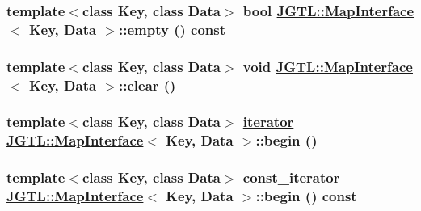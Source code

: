\hypertarget{class_j_g_t_l_1_1_map_interface_66e2355bebebd18fca84dee62e0fffa5}{
\subsubsection[empty]{\setlength{\rightskip}{0pt plus 5cm}template$<$class Key, class Data$>$ bool \hyperlink{class_j_g_t_l_1_1_map_interface}{JGTL::Map\-Interface}$<$ Key, Data $>$::empty () const}}
\label{class_j_g_t_l_1_1_map_interface_66e2355bebebd18fca84dee62e0fffa5}


\hypertarget{class_j_g_t_l_1_1_map_interface_af2d3667a3a9cf577177720e2b757d03}{
\subsubsection[clear]{\setlength{\rightskip}{0pt plus 5cm}template$<$class Key, class Data$>$ void \hyperlink{class_j_g_t_l_1_1_map_interface}{JGTL::Map\-Interface}$<$ Key, Data $>$::clear ()}}
\label{class_j_g_t_l_1_1_map_interface_af2d3667a3a9cf577177720e2b757d03}


\hypertarget{class_j_g_t_l_1_1_map_interface_b75e298063852903c54de5c9d17a2302}{
\subsubsection[begin]{\setlength{\rightskip}{0pt plus 5cm}template$<$class Key, class Data$>$ \hyperlink{class_j_g_t_l_1_1_map_interface_a8fcdbd899d0df84ce1aaa67d8dc000e}{iterator} \hyperlink{class_j_g_t_l_1_1_map_interface}{JGTL::Map\-Interface}$<$ Key, Data $>$::begin ()}}
\label{class_j_g_t_l_1_1_map_interface_b75e298063852903c54de5c9d17a2302}


\hypertarget{class_j_g_t_l_1_1_map_interface_38bbeb2dba7c6b3d8a8a2e6f441b1757}{
\subsubsection[begin]{\setlength{\rightskip}{0pt plus 5cm}template$<$class Key, class Data$>$ \hyperlink{class_j_g_t_l_1_1_map_interface_bbce6cc516069a5a504e0ae5b9aecd88}{const\_\-iterator} \hyperlink{class_j_g_t_l_1_1_map_interface}{JGTL::Map\-Interface}$<$ Key, Data $>$::begin () const}}
\label{class_j_g_t_l_1_1_map_interface_38bbeb2dba7c6b3d8a8a2e6f441b1757}


